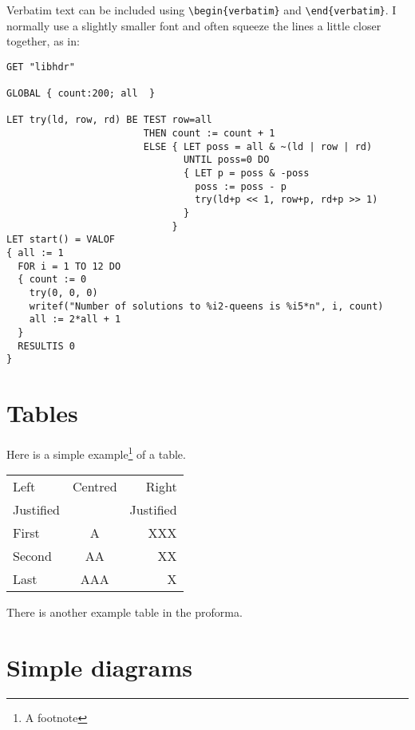 \documentclass[12pt,twoside,notitlepage]{report}
\renewcommand{\baselinestretch}{1.1}    %
\begin{document}
Verbatim text can be included using \verb|\begin{verbatim}| and
\verb|\end{verbatim}|. I normally use a slightly smaller font and
often squeeze the lines a little closer together, as in:

{\renewcommand{\baselinestretch}{0.8}\small\begin{verbatim}
GET "libhdr"

GLOBAL { count:200; all  }

LET try(ld, row, rd) BE TEST row=all
                        THEN count := count + 1
                        ELSE { LET poss = all & ~(ld | row | rd)
                               UNTIL poss=0 DO
                               { LET p = poss & -poss
                                 poss := poss - p
                                 try(ld+p << 1, row+p, rd+p >> 1)
                               }
                             }
LET start() = VALOF
{ all := 1
  FOR i = 1 TO 12 DO
  { count := 0
    try(0, 0, 0)
    writef("Number of solutions to %i2-queens is %i5*n", i, count)
    all := 2*all + 1
  }
  RESULTIS 0
}
\end{verbatim}
}

\section{Tables}

\begin{samepage}
Here is a simple example\footnote{A footnote} of a table.

\begin{center}
\begin{tabular}{l|c|r}
Left      & Centred & Right \\
Justified &         & Justified \\[3mm]
First     & A       & XXX \\
Second    & AA      & XX  \\
Last      & AAA     & X   \\
\end{tabular}
\end{center}

\noindent
There is another example table in the proforma.
\end{samepage}

\section{Simple diagrams}
\end{document}
